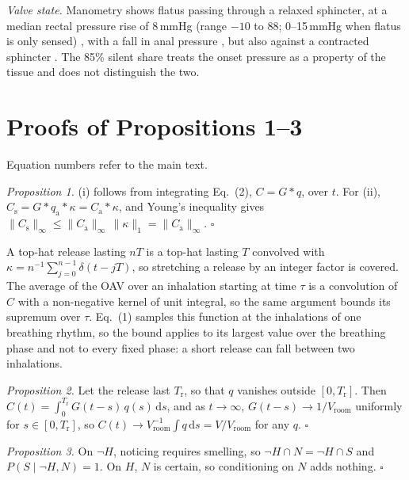 \documentclass[11pt]{article}
\begin{document}
\emph{Valve state.} Manometry shows flatus passing through a relaxed sphincter, at a median rectal pressure rise
of 8\,mmHg (range $-10$ to 88; 0--15\,mmHg when flatus is only sensed) \cite{miller1988b}, with a fall in anal
pressure \cite{ronholt1999}, but also against a contracted sphincter \cite{kumar1990}. The 85\% silent share
treats the onset pressure as a property of the tissue and does not distinguish the two.

\section{Proofs of Propositions 1--3}
\label{sec:si-proofs}
Equation numbers refer to the main text.

\emph{Proposition 1.} (i) follows from integrating Eq.~(2), $C = G*q$, over $t$. For (ii),
$C_\mathrm{s} = G*q_\mathrm{a}*\kappa = C_\mathrm{a}*\kappa$, and Young's inequality gives
$\|C_\mathrm{s}\|_\infty \le \|C_\mathrm{a}\|_\infty\,\|\kappa\|_1 = \|C_\mathrm{a}\|_\infty$. \hfill$\square$

A top-hat release lasting $nT$ is a top-hat lasting $T$ convolved with
$\kappa = n^{-1}\sum_{j=0}^{n-1}\delta(t-jT)$, so stretching a release by an integer factor is covered. The
average of the OAV over an inhalation starting at time $\tau$ is a convolution of $C$ with a non-negative kernel of
unit integral, so the same argument bounds its supremum over $\tau$. Eq.~(1) samples this function at the inhalations
of one breathing rhythm, so the bound applies to its largest value over the breathing phase and not to every fixed
phase: a short release can fall between two inhalations.

\emph{Proposition 2.} Let the release last $T_\mathrm{r}$, so that $q$ vanishes outside $[0, T_\mathrm{r}]$. Then
$C(t) = \int_0^{T_\mathrm{r}} G(t-s)\,q(s)\,\mathrm{d}s$, and as $t\to\infty$, $G(t-s)\to 1/V_\mathrm{room}$ uniformly
for $s\in[0,T_\mathrm{r}]$, so $C(t)\to V_\mathrm{room}^{-1}\int q\,\mathrm{d}s = V/V_\mathrm{room}$ for any $q$.
\hfill$\square$

\emph{Proposition 3.} On $\lnot H$, noticing requires smelling, so $\lnot H\cap N = \lnot H \cap S$ and
$P(S\mid\lnot H, N) = 1$. On $H$, $N$ is certain, so conditioning on $N$ adds nothing. \hfill$\square$
\end{document}
